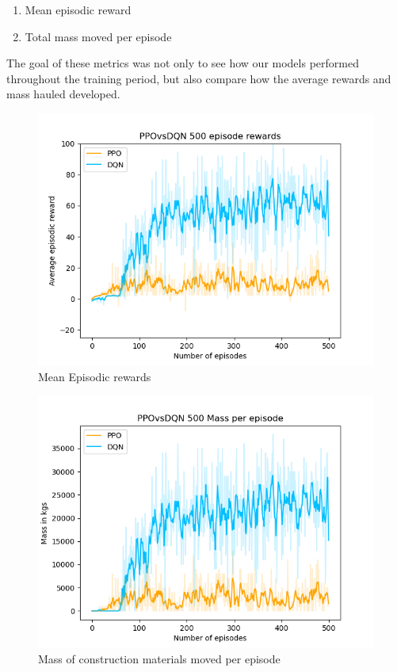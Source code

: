 \documentclass[conference]{IEEEtran}
\begin{document}
	\begin{enumerate}
		\item Mean episodic reward
		\item Total mass moved per episode
	\end{enumerate}

	The goal of these metrics was not only to see how our models performed throughout the training period, but also compare how the average rewards and mass hauled developed.

	\begin{figure}[h!]
		\includegraphics[width=\columnwidth]{graphs/PPOvsDQN500rews.png}
		\caption{Mean Episodic rewards}
	\end{figure}
	\begin{figure}[h!]
		\includegraphics[width=\columnwidth]{graphs/PPOvsDQN500mass.png}
		\caption{Mass of construction materials moved per episode}
	\end{figure}
\end{document}

